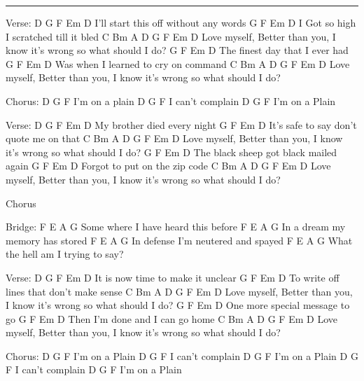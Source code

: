 \noindent\rule{\columnwidth}{1pt}

\begin{lstsong}
Verse:
D      G         F     Em        D           
I'll start this off without any words
  G       F      Em                D
I Got so high I scratched till it bled
C    Bm       A          D         G      F        Em             D
Love myself, Better than you, I know it's wrong so what should I do?
    G       F       Em       D
The finest day that I ever had
      G      F        Em      D
Was when I learned to cry on command
C    Bm       A          D         G      F        Em             D    
Love myself, Better than you, I know it's wrong so what should I do?

Chorus:
D   G   F  
          I'm on a plain 
D   G   F 
          I can't complain 
D   G   F 
          I'm on a Plain 

Verse:
D   G       F    Em    D
My brother died every night
       G      F        Em          D
It's safe to say don't quote me on that
C    Bm       A          D         G      F        Em             D
Love myself, Better than you, I know it's wrong so what should I do?
    G           F   Em            D
The black sheep got black mailed again
G       F     Em         D
Forgot to put on the zip code
C    Bm       A          D         G      F        Em             D    
Love myself, Better than you, I know it's wrong so what should I do?

Chorus

Bridge:
F         E                  A        G
Some where I have heard this before
F      E                  A        G
In a dream my memory has stored
F      E                    A        G
In defense I'm neutered and spayed
F         E                  A        G
What the hell am I trying to say?

Verse:
D  G      F       Em          D    
It is now time to make it unclear
   G        F           Em          D
To write off lines that don't make sense
C    Bm       A          D         G      F        Em             D
Love myself, Better than you, I know it's wrong so what should I do?
G          F       Em       D
One more special message to go
G         F       Em         D
Then I'm done and I can go home
C    Bm       A          D         G      F        Em             D   
Love myself, Better than you, I know it's wrong so what should I do?

Chorus:
D   G   F  
          I'm on a Plain 
D   G   F 
          I can't complain 
D   G   F 
          I'm on a Plain 
D   G   F 
          I can't complain
D   G   F 
          I'm on a Plain
\end{lstsong}
\newpage

